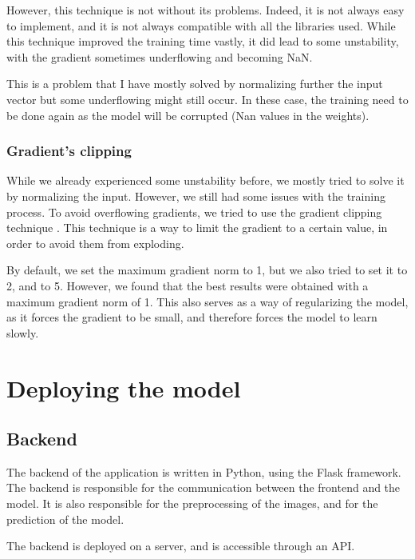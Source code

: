 \documentclass[11pt]{article}
\begin{document}
            However, this technique is not without its problems. Indeed, it is not always easy to implement, and it is not always compatible with all the libraries used.
            While this technique improved the training time vastly, it did lead to some unstability, with the gradient sometimes underflowing and becoming NaN.

            This is a problem that I have mostly solved by normalizing further the input vector but some underflowing might still occur. In these case, the training need to be done
            again as the model will be corrupted (Nan values in the weights).


    \subsubsection{Gradient's clipping}

        While we already experienced some unstability before, we mostly tried to solve it by normalizing the input.
        However, we still had some issues with the training process. To avoid overflowing gradients, we tried to use the gradient clipping technique \cite{gradient_clipping}.
        This technique is a way to limit the gradient to a certain value, in order to avoid them from exploding.

        By default, we set the maximum gradient norm to 1, but we also tried to set it to 2, and to 5. However, we found that the best results were obtained with a maximum gradient norm of 1.
        This also serves as a way of regularizing the model, as it forces the gradient to be small, and therefore forces the model to learn slowly.


    \section{Deploying the model}

        \subsection{Backend}

            The backend of the application is written in Python, using the Flask framework. The backend is responsible for the communication between the frontend and the model.
            It is also responsible for the preprocessing of the images, and for the prediction of the model.

            The backend is deployed on a server, and is accessible through an API.
\end{document}
